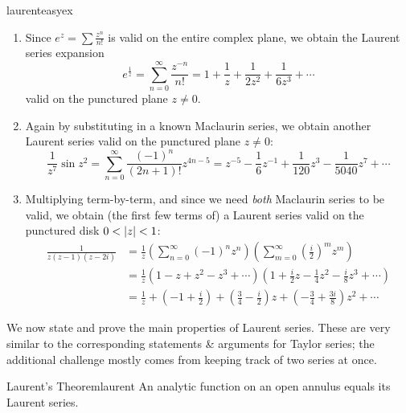 \begin{examples}{}{laurenteasyex}
\begin{enumerate}
	
	  \item Since $e^z=\sum \frac{z^n}{n!}$ is valid on the entire complex plane, we obtain the Laurent series expansion
	  \[
	  	e^{\frac 1z}=\sum_{n=0}^\infty\frac{z^{-n}}{n!}=1+\frac 1z+\frac 1{2z^2}+\frac 1{6z^3}+\cdots
	  \]
	  valid on the punctured plane $z\neq 0$.
	  
	  \item Again by substituting in a known Maclaurin series, we obtain another Laurent series valid on the punctured plane $z\neq 0$:
	  \[
	  	\frac 1{z^7}\sin z^2
	  	=\sum_{n=0}^\infty\frac{(-1)^n}{(2n+1)!}z^{4n-5} 
	  	=z^{-5}-\frac 16z^{-1}+\frac 1{120}z^3-\frac 1{5040}z^7+\cdots
	  \]
	  
	  \item Multiplying term-by-term, and since we need \emph{both} Maclaurin series to be valid, we obtain (the first few terms of) a Laurent series valid on the punctured disk $0<\left| z\right|<1$:
	  \begin{align*}
		  \frac 1{z(z-1)(z-2i)}&=\frac 1z\left(\sum_{n=0}^\infty (-1)^nz^n\right)\left(\sum_{m=0}^\infty\left(\frac i2\right)^mz^m\right)\\
		  &=\frac 1z\left(1-z+z^2-z^3+\cdots\right)\left(1+\frac i2z-\frac 14z^2-\frac i8z^3+\cdots\right)\\
		  &=\frac 1z+\left(-1+\frac i2\right)+\left(\frac 34-\frac i2\right)z+\left(-\frac 34+\frac{3i}8\right)z^2+\cdots
	  \end{align*}
	\end{enumerate}
\end{examples}

\goodbreak



We now state and prove the main properties of Laurent series. These are very similar to the corresponding statements \& arguments for Taylor series; the additional challenge mostly comes from keeping track of two series at once.

\begin{thm}{Laurent's Theorem}{laurent}
	An analytic function on an open annulus equals its Laurent series.
\end{thm}


